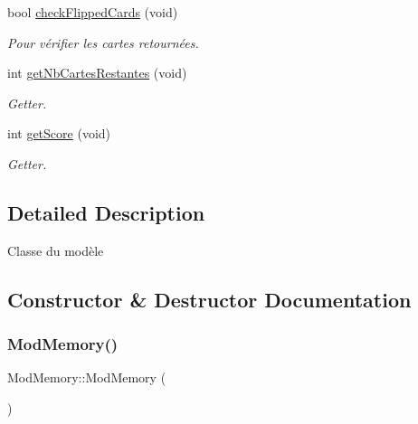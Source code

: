 \begin{DoxyCompactItemize}
\mbox{\label{class_mod_memory_a61796a869477464606b0c59b6d2aa017}} 
bool \hyperlink{class_mod_memory_a61796a869477464606b0c59b6d2aa017}{check\+Flipped\+Cards} (void)
\begin{DoxyCompactList}\small\item\em Pour vérifier les cartes retournées. \end{DoxyCompactList}\item 
\mbox{\label{class_mod_memory_ada71dd41fee113c35c644f4c2e335096}} 
int \hyperlink{class_mod_memory_ada71dd41fee113c35c644f4c2e335096}{get\+Nb\+Cartes\+Restantes} (void)
\begin{DoxyCompactList}\small\item\em Getter. \end{DoxyCompactList}\item 
\mbox{\label{class_mod_memory_a5262e59284dcba47e86e4a4761211d33}} 
int \hyperlink{class_mod_memory_a5262e59284dcba47e86e4a4761211d33}{get\+Score} (void)
\begin{DoxyCompactList}\small\item\em Getter. \end{DoxyCompactList}\end{DoxyCompactItemize}


\subsection{Detailed Description}
Classe du modèle 

\subsection{Constructor \& Destructor Documentation}
\mbox{\label{class_mod_memory_a8604678a120d5f8e430d5d2248a44e36}} 
\subsubsection{\texorpdfstring{Mod\+Memory()}{ModMemory()}}
{\footnotesize\ttfamily Mod\+Memory\+::\+Mod\+Memory (\begin{DoxyParamCaption}{ }\end{DoxyParamCaption})}



